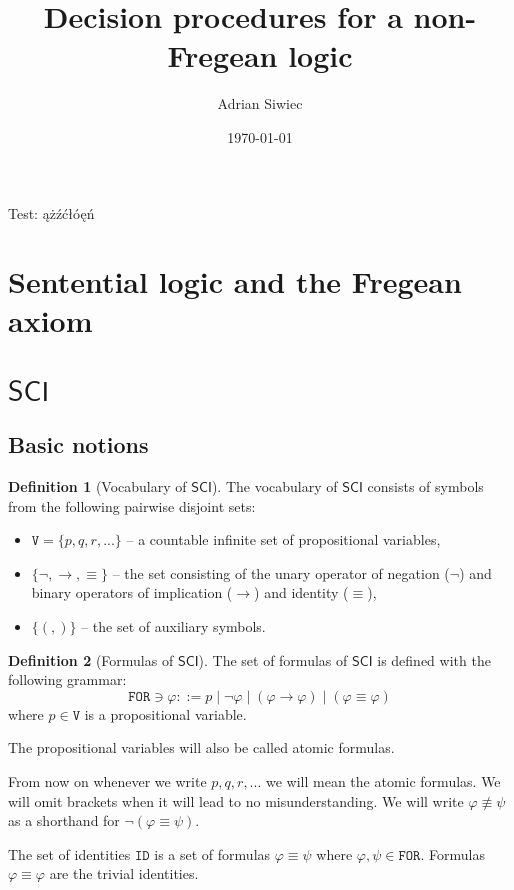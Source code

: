 \documentclass{article}
\title{Decision procedures for a non-Fregean logic \SCI}
\author{Adrian Siwiec}
\theoremstyle{definition}
\newtheorem{definition}{Definition}[section]
\theoremstyle{definition}
\newcommand*{\id}{\equiv}
\newcommand*{\ra}{\rightarrow}
\newcommand*{\V}{\texttt{V}}
\newcommand*{\FOR}{\texttt{FOR}}
\newcommand*{\ID}{\texttt{ID}}
\newcommand{\SCI}{$\mathsf{SCI}$\xspace}
\begin{document}
\date{\today}

\maketitle

Test: ążźćłóęń

\section{Sentential logic and the Fregean axiom}
\section{\SCI}
\subsection{Basic notions}

\begin{definition}[Vocabulary of \SCI]
    The vocabulary of \SCI consists of symbols from the following pairwise disjoint sets:
    \begin{itemize}
        \item $\V = \{p, q, r, ...\}$ -- a countable infinite set of propositional variables,
        \item $\{\lnot, \ra, \id \}$  -- the set consisting of the unary operator of negation ($\lnot$) and binary operators of implication ($\ra$) and identity ($\id$),
        \item $\{(,)\}$ -- the set of auxiliary symbols.
    \end{itemize}
\end{definition}
\begin{definition}[Formulas of \SCI]
    The set of formulas of \SCI is defined with the following grammar:
    $$
        \FOR \ni \varphi ::= p  \; | \;  \lnot \varphi \; | \; (\varphi \ra \varphi) \; | \; (\varphi \id \varphi)
    $$ where $p \in \V$ is a propositional variable.
\end{definition}
The propositional variables will also be called atomic formulas.

From now on whenever we write $p, q, r, ... $ we will mean the atomic formulas.
We will omit brackets when it will lead to no misunderstanding. We will write
$\varphi \not \id \psi$ as a shorthand for $\lnot(\varphi \id \psi)$.

The set of identities $\ID$ is a set of formulas $\varphi \id \psi$ where
$\varphi, \psi \in \FOR$. Formulas $\varphi \id \varphi$ are the trivial
identities.
\end{document}
